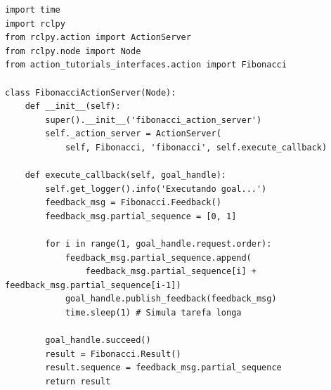 \documentclass[preview,border=2pt]{standalone}
\begin{document}
\begin{lstlisting}[style=pythonstyle]
import time
import rclpy
from rclpy.action import ActionServer
from rclpy.node import Node
from action_tutorials_interfaces.action import Fibonacci

class FibonacciActionServer(Node):
    def __init__(self):
        super().__init__('fibonacci_action_server')
        self._action_server = ActionServer(
            self, Fibonacci, 'fibonacci', self.execute_callback)

    def execute_callback(self, goal_handle):
        self.get_logger().info('Executando goal...')
        feedback_msg = Fibonacci.Feedback()
        feedback_msg.partial_sequence = [0, 1]

        for i in range(1, goal_handle.request.order):
            feedback_msg.partial_sequence.append(
                feedback_msg.partial_sequence[i] + feedback_msg.partial_sequence[i-1])
            goal_handle.publish_feedback(feedback_msg)
            time.sleep(1) # Simula tarefa longa

        goal_handle.succeed()
        result = Fibonacci.Result()
        result.sequence = feedback_msg.partial_sequence
        return result
\end{lstlisting}
\end{document}

